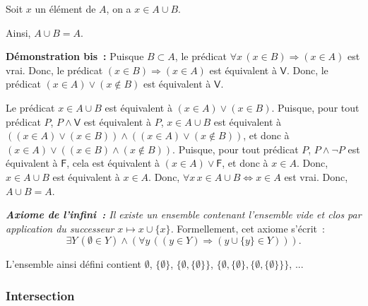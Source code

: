     Soit $x$ un élément de $A$, on a $x \in A \cup B$.

    Ainsi, $A \cup B = A$.

    \done

\medskip

\noindent\textbf{Démonstration bis :} 
    Puisque $B \subset A$, le prédicat $\forall x \, (x \in B) \Rightarrow (x \in A)$ est vrai.
    Donc, le prédicat $(x \in B) \Rightarrow (x \in A)$ est équivalent à $\mathsf{V}$.
    Donc, le prédicat $(x \in A) \vee (x \notin B)$ est équivalent à $\mathsf{V}$.
    
    Le prédicat $x \in A \cup B$ est équivalent à $(x \in A) \vee (x \in B)$.
    Puisque, pour tout prédicat $P$, $P \wedge \mathsf{V}$ est équivalent à $P$, $x \in A \cup B$ est équivalent à $((x \in A) \vee (x \in B)) \wedge ((x \in A) \vee (x \notin B))$, et donc à $(x \in A) \vee ((x \in B) \wedge (x \notin B))$.
    Puisque, pour tout prédicat $P$, $P \wedge \neg P$ est équivalent à $\mathsf{F}$, cela est équivalent à $(x \in A) \vee \mathsf{F}$, et donc à $x \in A$.
    Donc, $x \in A \cup B$ est équivalent à $x \in A$.
    Donc, $\forall x \, x \in A \cup B \Leftrightarrow x \in A$ est vrai.
    Donc, $A \cup B = A$.

\done

\medskip

\noindent\textit{\textbf{Axiome de l'infini :} Il existe un ensemble contenant l'ensemble vide et clos par application du successeur $x \mapsto x \cup \lbrace x \rbrace$.} Formellement, cet axiome s'écrit : 
\begin{equation*}
    \exists Y \, (\emptyset \in Y) \wedge (\forall y \, ((y \in Y) \Rightarrow (y \cup \lbrace y \rbrace \in Y))). 
\end{equation*}

\medskip

L'ensemble ainsi défini contient $\emptyset$, $\lbrace \emptyset \rbrace$, $\lbrace \emptyset, \lbrace \emptyset \rbrace \rbrace$, $\lbrace \emptyset, \lbrace \emptyset \rbrace, \lbrace \emptyset, \lbrace \emptyset \rbrace \rbrace \rbrace$, ...

\subsubsection{Intersection} 

